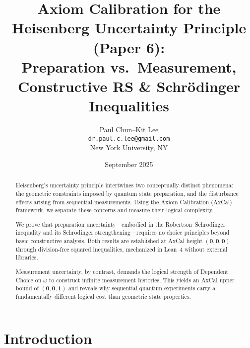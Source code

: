 \documentclass[11pt]{article}
\title{Axiom Calibration for the Heisenberg Uncertainty Principle (Paper 6):\\
Preparation vs.\ Measurement, Constructive RS \& Schrödinger Inequalities}
\author{Paul Chun--Kit Lee\\
\texttt{dr.paul.c.lee@gmail.com}\\
New York University, NY}
\date{September 2025}
\theoremstyle{plain}
\theoremstyle{definition}
\theoremstyle{remark}
\begin{document}
\maketitle

\begin{abstract}
Heisenberg's uncertainty principle intertwines two conceptually distinct phenomena: the geometric constraints imposed by quantum state preparation, and the disturbance effects arising from sequential measurements. Using the Axiom Calibration (AxCal) framework, we separate these concerns and measure their logical complexity.

We prove that preparation uncertainty---embodied in the Robertson--Schrödinger inequality and its Schrödinger strengthening---requires no choice principles beyond basic constructive analysis. Both results are established at AxCal height $(\mathbf{0},\mathbf{0},\mathbf{0})$ through division-free squared inequalities, mechanized in Lean~4 without external libraries.

Measurement uncertainty, by contrast, demands the logical strength of Dependent Choice on $\omega$ to construct infinite measurement histories. This yields an AxCal upper bound of $(\mathbf{0},\mathbf{0},\mathbf{1})$ and reveals why sequential quantum experiments carry a fundamentally different logical cost than geometric state properties.
\end{abstract}

\tableofcontents

\noindent{}

\section{Introduction}
\end{document}
